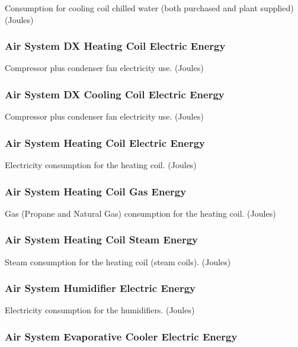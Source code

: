 Consumption for cooling coil chilled water (both purchased and plant supplied) (Joules)

\subsubsection{Air System DX Heating Coil Electric Energy}\label{air-system-dx-heating-coil-electric-energy}

Compressor plus condenser fan electricity use. (Joules)

\subsubsection{Air System DX Cooling Coil Electric Energy}\label{air-system-dx-cooling-coil-electric-energy}

Compressor plus condenser fan electricity use. (Joules)

\subsubsection{Air System Heating Coil Electric Energy}\label{air-system-heating-coil-electric-energy}

Electricity consumption for the heating coil. (Joules)

\subsubsection{Air System Heating Coil Gas Energy}\label{air-system-heating-coil-gas-energy}

Gas (Propane and Natural Gas) consumption for the heating coil. (Joules)

\subsubsection{Air System Heating Coil Steam Energy}\label{air-system-heating-coil-steam-energy}

Steam consumption for the heating coil (steam coils). (Joules)

\subsubsection{Air System Humidifier Electric Energy}\label{air-system-humidifier-electric-energy}

Electricity consumption for the humidifiers. (Joules)

\subsubsection{Air System Evaporative Cooler Electric Energy}\label{air-system-evaporative-cooler-electric-energy}

